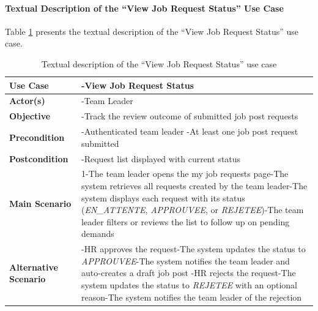 \paragraph{Textual Description of the ``View Job Request Status'' Use Case}
Table \ref{tab:view-job-request} presents the textual description of the ``View Job Request Status'' use case.

\begin{table}[H]
\centering
\caption{Textual description of the ``View Job Request Status'' use case}
\label{tab:view-job-request}
\begin{tabular}{|p{}|p{}|}
    \hline
   \textbf{Use Case} & -View Job Request Status \\
    \hline
    \textbf{Actor(s)} & -Team Leader \\
    \hline
    \textbf{Objective} & -Track the review outcome of submitted job post requests \\
    \hline
    \textbf{Precondition} & -Authenticated team leader\newline
-At least one job post request submitted \\
    \hline
    \textbf{Postcondition} & -Request list displayed with current status \\
    \hline
    \textbf{Main Scenario}
    & 1-The team leader opens the my job requests page\newline
2-The system retrieves all requests created by the team leader\newline
3-The system displays each request with its status (\textit{EN\_ATTENTE}, \textit{APPROUVEE}, or \textit{REJETEE})\newline
4-The team leader filters or reviews the list to follow up on pending demands \\ \hline
    \textbf{Alternative Scenario}
    & -HR approves the request\newline
1-The system updates the status to \textit{APPROUVEE}\newline
2-The system notifies the team leader and auto-creates a draft job post\newline
\newline
-HR rejects the request\newline
1-The system updates the status to \textit{REJETEE} with an optional reason\newline
2-The system notifies the team leader of the rejection \\ \hline
\end{tabular}
\end{table}

